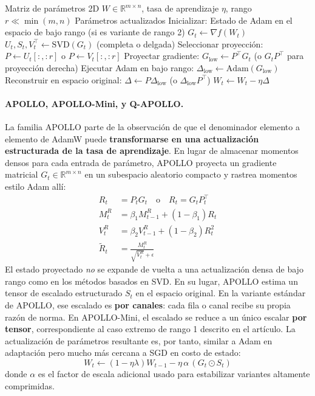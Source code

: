 \begin{algorithm}[H]
\caption{GaLore (Gradient Low-Rank Projection)}
\label{alg:galore}
\begin{algorithmic}[1]
\Require Matriz de parámetros 2D $W \in \mathbb{R}^{m \times n}$, tasa de aprendizaje $\eta$, rango $r \ll \min(m,n)$
\Ensure Parámetros actualizados
\State Inicializar: Estado de Adam en el espacio de bajo rango (si es variante de rango 2)
    \State $G_t \gets \nabla f(W_t)$
      
        \State $U_t, S_t, V_t^\top \gets \text{SVD}(G_t)$ (completa o delgada)
        \State Seleccionar proyección: $P \gets U_t[:, :r]$ o $P \gets V_t[:, :r]$
    \EndIf
    \State Proyectar gradiente: $G_{\text{low}} \gets P^\top G_t$ (o $G_t P^\top$ para proyección derecha)
    \State Ejecutar Adam en bajo rango: $\Delta_{\text{low}} \gets \text{Adam}(G_{\text{low}})$
    \State Reconstruir en espacio original: $\Delta \gets P \Delta_{\text{low}}$ (o $\Delta_{\text{low}} P^\top$)
    \State $W_t \gets W_t - \eta \Delta$
\EndFor
\end{algorithmic}
\end{algorithm}

\paragraph{APOLLO, APOLLO-Mini, y Q-APOLLO.}
La familia APOLLO \citep{zhu2025apollosgdlikememoryadamwlevel} parte de la observación de que el denominador elemento a elemento de AdamW puede \textbf{transformarse en una actualización estructurada de la tasa de aprendizaje}. En lugar de almacenar momentos densos para cada entrada de parámetro, APOLLO proyecta un gradiente matricial $G_t \in \mathbb{R}^{m \times n}$ en un subespacio aleatorio compacto y rastrea momentos estilo Adam allí:
\begin{align}
R_t &= P_t G_t \quad\text{o}\quad R_t = G_t P_t^\top \\
M_t^R &= \beta_1 M_{t-1}^R + (1-\beta_1)R_t \\
V_t^R &= \beta_2 V_{t-1}^R + (1-\beta_2)R_t^2 \\
\widetilde{R}_t &= \frac{M_t^R}{\sqrt{V_t^R}+\epsilon}
\end{align}
El estado proyectado \emph{no} se expande de vuelta a una actualización densa de bajo rango como en los métodos basados en SVD. En su lugar, APOLLO estima un tensor de escalado estructurado $S_t$ en el espacio original. En la variante estándar de APOLLO, ese escalado es \textbf{por canales}: cada fila o canal recibe su propia razón de norma. En APOLLO-Mini, el escalado se reduce a un único escalar \textbf{por tensor}, correspondiente al caso extremo de rango 1 descrito en el artículo. La actualización de parámetros resultante es, por tanto, similar a Adam en adaptación pero mucho más cercana a SGD en costo de estado:
\[
W_t \gets (1-\eta\lambda)W_{t-1} - \eta\,\alpha\,(G_t \odot S_t)
\]
donde $\alpha$ es el factor de escala adicional usado para estabilizar variantes altamente comprimidas.

